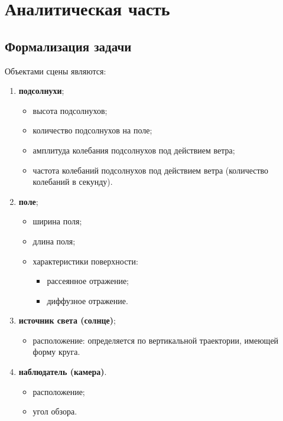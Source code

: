 \chapter{Аналитическая часть}

\section{Формализация задачи}
Объектами сцены являются:

\begin{enumerate}
    \item \textbf{подсолнухи};
    \begin{itemize}
        \item высота подсолнухов;
        \item количество подсолнухов на поле;
        \item амплитуда колебания подсолнухов под действием ветра;
        \item частота колебаний подсолнухов под действием ветра (количество колебаний в секунду).
    \end{itemize}

    \item \textbf{поле};
    \begin{itemize}
        \item ширина поля;
        \item длина поля;
        \item характеристики поверхности:
        \begin{itemize}
            \item рассеянное отражение;
            \item диффузное отражение.
        \end{itemize}
    \end{itemize}

    \item \textbf{источник света (солнце)};
    \begin{itemize}
        \item расположение: определяется по вертикальной траектории, имеющей форму круга.
    \end{itemize}

    \item \textbf{наблюдатель (камера)}.
    \begin{itemize}
        \item расположение;
        \item угол обзора.
    \end{itemize}
\end{enumerate}

